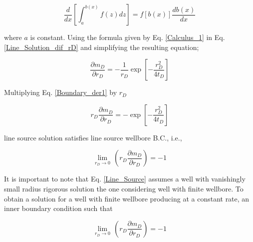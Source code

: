 \documentclass{llncs}
\numberwithin{equation}{section}
\numberwithin{figure}{section}
\numberwithin{table}{section}
\begin{document}
    
    \begin{equation}     
    \frac{d}{dx}\left[ \int_{a}^{b\left( x \right)}{f\left( z \right)dz} \right]=f\left[ b\left( x \right) \right]\frac{db\left( x \right)}{dx}
        \label{Calculus_1}
    \end{equation}     
    
    where $a$ is constant. Using the formula given by Eq. \ref{Calculus_1} in Eq. \ref{Line_Solution_dif_rD} and simplifying the resulting equation; 
    
    \begin{equation}     
    \frac{\partial {{ m }_{D}}}{\partial {{r}_{D}}}=-\frac{1}{{{r}_{D}}}\exp \left[ -\frac{r_{D}^{2}}{4{{t}_{D}}} \right]
        \label{Boundary_der1}
    \end{equation}    
    
    Multiplying Eq. \ref{Boundary_der1} by $r_{D}$
    
    \begin{equation}      
    {{r}_{D}}\frac{\partial {{ m }_{D}}}{\partial {{r}_{D}}}=-\exp \left[ -\frac{r_{D}^{2}}{4{{t}_{D}}} \right]
        \label{Boundary_der2}
    \end{equation}     
    
     line source solution satisfies  line source wellbore B.C., i.e.,
    
    \begin{equation*}
        \underset{{{r}_{D}}\to 0}{\mathop{\lim }}\,\left( {{r}_{D}}\frac{\partial {{m}_{D}}}{\partial {{r}_{D}}} \right)=-1
    \end{equation*}       
    
    It is important to note that Eq. \ref{Line_Source} assumes  a well with vanishingly small radius rigorous solution  the one considering  well with finite wellbore. To obtain a solution for a well with finite wellbore producing at a constant rate, an inner boundary condition  such that
       
    \begin{equation}
        \underset{{{r}_{D}}\to 0}{\mathop{\lim }}\,\left( {{r}_{D}}\frac{\partial {{m}_{D}}}{\partial {{r}_{D}}} \right)=-1
        \label{Inner_Boundary1}        
    \end{equation}      
    
\end{document}
